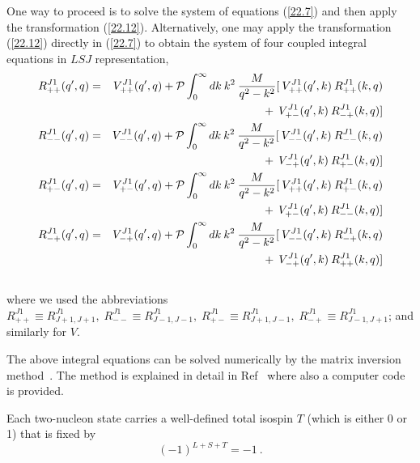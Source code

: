 One way to proceed is to solve the system of equations (\ref{22.7})
and then apply the transformation (\ref{22.12}).
Alternatively, one may apply the transformation (\ref{22.12})
directly in (\ref{22.7}) 
to obtain the system of four coupled integral equations
in $LSJ$ representation,
\begin{eqnarray}
{R}^{J1}_{++}(q',q)&=& {V}^{J1}_{++}(q',q)
+{\cal P}\int^{\infty}_0 dk\: k^2\: \frac{M}{q^2-k^2}
[\: {V}^{J1}_{++}(q',k)\: {R}^{J1}_{++}(k,q)  
\nonumber \\  & & \mbox{} 
+\: {V}^{J1}_{+-}(q',k)\: {R}^{J1}_{-+}(k,q)]  
\nonumber \\
{R}^{J1}_{--}(q',q)&=& {V}^{J1}_{--}(q',q)
+{\cal P}\int^{\infty}_0 dk\: k^2\: \frac{M}{q^2-k^2}
[\: {V}^{J1}_{--}(q',k)\: {R}^{J1}_{--}(k,q) 
\nonumber \\  & & \mbox{}
+\: {V}^{J1}_{-+}(q',k)\: {R}^{J1}_{+-}(k,q)]   
\nonumber \\
{R}^{J1}_{+-}(q',q)&=& {V}^{J1}_{+-}(q',q)
+{\cal P}\int^{\infty}_0 dk\: k^2\: \frac{M}{q^2-k^2}
[\: {V}^{J1}_{++}(q',k)\: {R}^{J1}_{+-}(k,q) 
\nonumber \\ & & \mbox{} 
+\: {V}^{J1}_{+-}(q',k)\: {R}^{J1}_{--}(k,q)]  
\nonumber \\
{R}^{J1}_{-+}(q',q)&=& {V}^{J1}_{-+}(q',q)
+{\cal P}\int^{\infty}_0 dk\: k^2\: \frac{M}{q^2-k^2}
[\: {V}^{J1}_{--}(q',k)\: {R}^{J1}_{-+}(k,q) 
\nonumber \\ & & \mbox{} 
+\: {V}^{J1}_{-+}(q',k)\: {R}^{J1}_{++}(k,q)]  
\nonumber \\
\mbox{} \label{22.13}
\end{eqnarray}
where we used the abbreviations  
${R}^{J1}_{++}\equiv {R}^{J1}_{J+1,J+1},\;
{R}^{J1}_{--}\equiv {R}^{J1}_{J-1,J-1},\;
{R}^{J1}_{+-}\equiv {R}^{J1}_{J+1,J-1},\;
{R}^{J1}_{-+}\equiv {R}^{J1}_{J-1,J+1}$;
and similarly for $V$.

The above integral equations can be solved numerically by the matrix
inversion method~\cite{HT70}.
The method is explained in detail in Ref~\cite{Mac93} where also
a computer code is provided.

Each two-nucleon state carries a well-defined
total isospin $T$ (which is either 0 or 1) that is fixed by
\begin{equation}
(-1)^{L+S+T}=-1\: .
\label{22.14}
\end{equation}


